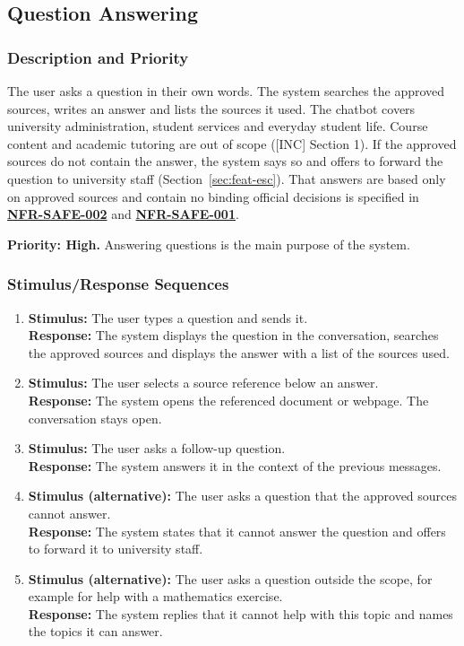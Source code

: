 \documentclass[11pt, a4paper]{article}
\newcommand{\reqref}[1]{\hyperref[req:#1]{\textbf{#1}}}
\begin{document}
\subsection{Question Answering}
\label{sec:feat-ans}
\subsubsection{Description and Priority}
The user asks a question in their own words. The system searches the approved sources, writes an answer and lists the sources it used. The chatbot covers university administration, student services and everyday student life. Course content and academic tutoring are out of scope ([INC] Section 1). If the approved sources do not contain the answer, the system says so and offers to forward the question to university staff (Section~\ref{sec:feat-esc}). That answers are based only on approved sources and contain no binding official decisions is specified in \reqref{NFR-SAFE-002} and \reqref{NFR-SAFE-001}.

\textbf{Priority: High.} Answering questions is the main purpose of the system.

\subsubsection{Stimulus/Response Sequences}
\begin{enumerate}
    \item \textbf{Stimulus:} The user types a question and sends it.\\
          \textbf{Response:} The system displays the question in the conversation, searches the approved sources and displays the answer with a list of the sources used.
    \item \textbf{Stimulus:} The user selects a source reference below an answer.\\
          \textbf{Response:} The system opens the referenced document or webpage. The conversation stays open.
    \item \textbf{Stimulus:} The user asks a follow-up question.\\
          \textbf{Response:} The system answers it in the context of the previous messages.
    \item \textbf{Stimulus (alternative):} The user asks a question that the approved sources cannot answer.\\
          \textbf{Response:} The system states that it cannot answer the question and offers to forward it to university staff.
    \item \textbf{Stimulus (alternative):} The user asks a question outside the scope, for example for help with a mathematics exercise.\\
          \textbf{Response:} The system replies that it cannot help with this topic and names the topics it can answer.
\end{enumerate}
\end{document}
